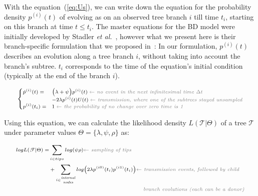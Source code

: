 \documentclass[10pt,letterpaper]{article}
\begin{document}
With the equation~(\ref{eq:Us}), we can write down the equation for the probability density $p^{(i)}(t)$ of evolving as on an observed tree branch $i$ till time $t_i$, starting on this branch at time $t \leq t_i$. The master equations for the BD model were initially developed by Stadler \textit{et al.}~\cite{Stadler2009}, however what we present here is their branch-specific formulation that we proposed in~\cite{zhukovaFastAccurateMaximumLikelihood2022}:
In our formulation, ${p}^{(i)}(t)$ describes an evolution along a tree branch $i$, without taking into account the branch's subtree. $t_i$ corresponds to the time of the equation's initial condition (typically at the end of the branch $i$). %

\begin{equation}
\scriptsize
\begin{cases}
\dot{p}^{(i)}(t) = & \Big(\lambda + \psi\Big) p^{(i)}(t)\; \textit{\color{gray} $\leftarrow$ no event in the next infinitesimal time $\Delta t$ }\\
    & - 2 \lambda p^{(i)}(t)U(t)\;  \textit{\color{gray} $\leftarrow$ transmission, where one of the subtrees stayed unsampled}\\
p^{(i)}(t_i) =  &1\;  \textit{\color{gray} $\leftarrow$ the probability of no change over zero time is 1}
\end{cases}\label{eq:p}
\end{equation}


Using this equation, we can calculate the likelihood density $L(\mathscr{T}|\Theta)$ of a tree $\mathscr{T}$ under parameter values $\Theta = \{\lambda, \psi, \rho\}$ as:

\begin{equation}
\scriptsize
\begin{split}
log L(\mathscr{T}|\Theta) =  &\sum\limits_{i \in tips}  log(\psi \rho)  \textit{\color{gray} $\leftarrow$ sampling of tips} \\
 &+\sum\limits_{i \in \stackanchor{\tiny\textit{internal}}{\tiny\textit{nodes}}} log \big(2 \lambda p^{(i0)}(t_i)p^{(i1)}(t_i)\big)   \textit{\color{gray} $\leftarrow$ transmission events, followed by child }\\
 & ~~~~~~~~~~~~~~~~~~~~~~~~~~~~~~~~~~~~~~~~~~~~~~~~~~\textit{\color{gray} branch evolutions (each can be a donor)}  \label{eq:mtbd_tree_likelihood}
\end{split}
\end{equation}
\end{document}
